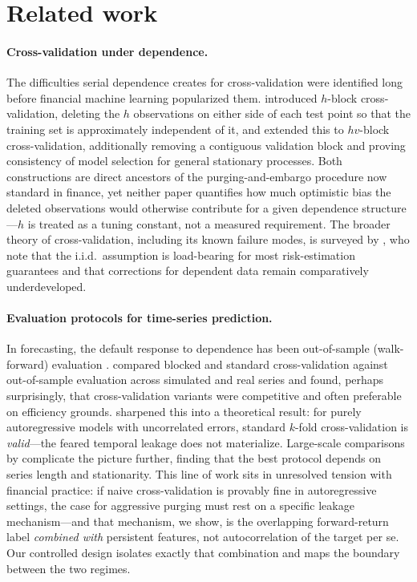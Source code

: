 \documentclass[11pt]{article}
\begin{document}
\section{Related work}
\label{sec:related}

\paragraph{Cross-validation under dependence.} The difficulties serial
dependence creates for cross-validation were identified long before financial
machine learning popularized them. \citet{burman1994crossvalidatory}
introduced $h$-block cross-validation, deleting the $h$ observations on
either side of each test point so that the training set is approximately
independent of it, and \citet{racine2000consistent} extended this to
$hv$-block cross-validation, additionally removing a contiguous validation
block and proving consistency of model selection for general stationary
processes. Both constructions are direct ancestors of the purging-and-embargo
procedure now standard in finance, yet neither paper quantifies how much
optimistic bias the deleted observations would otherwise contribute for a
given dependence structure---$h$ is treated as a tuning constant, not a
measured requirement. The broader theory of cross-validation, including its
known failure modes, is surveyed by \citet{arlot2010survey}, who note that
the i.i.d.\ assumption is load-bearing for most risk-estimation guarantees
and that corrections for dependent data remain comparatively underdeveloped.

\paragraph{Evaluation protocols for time-series prediction.} In forecasting,
the default response to dependence has been out-of-sample (walk-forward)
evaluation \citep{tashman2000out}. \citet{bergmeir2012use} compared blocked
and standard cross-validation against out-of-sample evaluation across
simulated and real series and found, perhaps surprisingly, that
cross-validation variants were competitive and often preferable on efficiency
grounds. \citet{bergmeir2018note} sharpened this into a theoretical result:
for purely autoregressive models with uncorrelated errors, standard $k$-fold
cross-validation is \emph{valid}---the feared temporal leakage does not
materialize. Large-scale comparisons by \citet{cerqueira2020evaluating}
complicate the picture further, finding that the best protocol depends on
series length and stationarity. This line of work sits in unresolved tension
with financial practice: if naive cross-validation is provably fine in
autoregressive settings, the case for aggressive purging must rest on a
specific leakage mechanism---and that mechanism, we show, is the overlapping
forward-return label \emph{combined with} persistent features, not
autocorrelation of the target per se. Our controlled design isolates exactly
that combination and maps the boundary between the two regimes.
\end{document}
